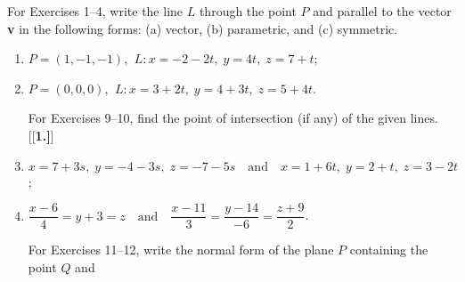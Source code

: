 \centerline{}\label{sec1dot5}
\par\noindent For Exercises 1--4, write the line $L$ through the point $P$ and parallel to the vector \textbf{v} in the
 following forms: (a) vector, (b) parametric, and (c) symmetric.
\begin{enumerate}[\bfseries 1.]
\par\noindent For Exercises 5--6, write the line $L$ through the points $\ssub{P}{1}$ and $\ssub{P}{2}$ in parametric
form.
[{[\bfseries 1.]}]
\par\noindent For Exercises 7--8, (a) find the distance $d$ from the point $P$ to the line $L$ (b) find the orthogonal projection of $P$ to $L$
[{[\bfseries 1.]}]
 \item $P = (1,-1,-1)$, $~L: x = -2 - 2t, \; y = 4t, \; z = 7 + t$;
 \item $P = (0,0,0)$, $~L: x = 3 + 2t, \; y = 4 + 3t, \; z = 5 + 4t$.
\par\noindent For Exercises 9--10, find the point of intersection (if any) of the given lines.
[{[\bfseries 1.]}]
 \item $x = 7 + 3s, \; y = -4 - 3s, \; z = -7 - 5s \quad \text{and} \quad x = 1 + 6t, \; y = 2 + t, \; z = 3 - 2t$;
 \item $\dfrac{x - 6}{4} = y + 3 = z \quad \text{and} \quad \dfrac{x - 11}{3} = \dfrac{y - 14}{-6} =
  \dfrac{z + 9}{2}$.
\par\noindent For Exercises 11--12, write the normal form of the plane $P$ containing the point $Q$ and

\end{enumerate}
